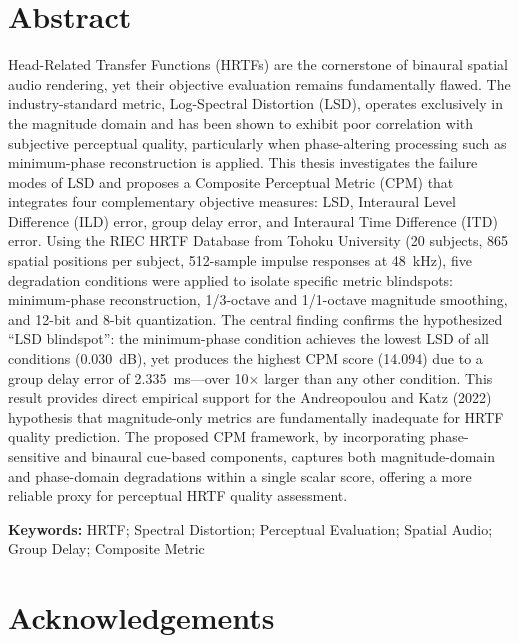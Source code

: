 \documentclass[12pt,a4paper]{article}
\begin{document}
\section*{Abstract}

Head-Related Transfer Functions (HRTFs) are the cornerstone of binaural spatial audio rendering, yet their objective evaluation remains fundamentally flawed. The industry-standard metric, Log-Spectral Distortion (LSD), operates exclusively in the magnitude domain and has been shown to exhibit poor correlation with subjective perceptual quality, particularly when phase-altering processing such as minimum-phase reconstruction is applied. This thesis investigates the failure modes of LSD and proposes a Composite Perceptual Metric (CPM) that integrates four complementary objective measures: LSD, Interaural Level Difference (ILD) error, group delay error, and Interaural Time Difference (ITD) error. Using the RIEC HRTF Database from Tohoku University (20 subjects, 865 spatial positions per subject, 512-sample impulse responses at 48~kHz), five degradation conditions were applied to isolate specific metric blindspots: minimum-phase reconstruction, 1/3-octave and 1/1-octave magnitude smoothing, and 12-bit and 8-bit quantization. The central finding confirms the hypothesized ``LSD blindspot'': the minimum-phase condition achieves the lowest LSD of all conditions (0.030~dB), yet produces the highest CPM score (14.094) due to a group delay error of 2.335~ms---over 10$\times$ larger than any other condition. This result provides direct empirical support for the Andreopoulou and Katz (2022) hypothesis that magnitude-only metrics are fundamentally inadequate for HRTF quality prediction. The proposed CPM framework, by incorporating phase-sensitive and binaural cue-based components, captures both magnitude-domain and phase-domain degradations within a single scalar score, offering a more reliable proxy for perceptual HRTF quality assessment.

\vspace{0.5cm}

\textbf{Keywords:} HRTF; Spectral Distortion; Perceptual Evaluation; Spatial Audio; Group Delay; Composite Metric

\newpage

\section*{Acknowledgements}
\end{document}
